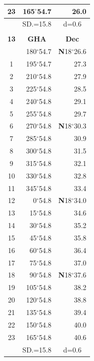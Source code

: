 \documentclass[10pt, a4paper]{report}
\begin{document}
\begin{scriptsize}
\begin{tabular*}{0.2\textwidth}[t]{@{\extracolsep{\fill}}|c|rr|}
23 & 165$^\circ$54.7 & 26.0\\
\hline
\rule{0pt}{2.4ex} & \multicolumn{1}{c}{SD.=15.8} & \multicolumn{1}{c|}{d=0.6}\\
\hline
\multicolumn{1}{c}{}\\[-0.5ex]\hline
\multicolumn{1}{|c|}{\rule{0pt}{2.6ex}\textbf{13}} & \multicolumn{1}{c}{\textbf{GHA}} & \multicolumn{1}{c|}{\textbf{Dec}}\\
\hline\rule{0pt}{2.6ex}\noindent
0 & 180$^\circ$54.7 & \textbf{N}18$^\circ$26.6\\
1 & 195$^\circ$54.7 & 27.3\\
2 & 210$^\circ$54.8 & 27.9\\
3 & 225$^\circ$54.8 & \raisebox{0.24ex}{\boldmath$\cdot$~\boldmath$\cdot$~~}28.5\\
4 & 240$^\circ$54.8 & 29.1\\
5 & 255$^\circ$54.8 & 29.7\\[2Pt]
6 & 270$^\circ$54.8 & \textbf{N}18$^\circ$30.3\\
7 & 285$^\circ$54.8 & 30.9\\
8 & 300$^\circ$54.8 & 31.5\\
9 & 315$^\circ$54.8 & \raisebox{0.24ex}{\boldmath$\cdot$~\boldmath$\cdot$~~}32.1\\
10 & 330$^\circ$54.8 & 32.8\\
11 & 345$^\circ$54.8 & 33.4\\[2Pt]
12 & 0$^\circ$54.8 & \textbf{N}18$^\circ$34.0\\
13 & 15$^\circ$54.8 & 34.6\\
14 & 30$^\circ$54.8 & 35.2\\
15 & 45$^\circ$54.8 & \raisebox{0.24ex}{\boldmath$\cdot$~\boldmath$\cdot$~~}35.8\\
16 & 60$^\circ$54.8 & 36.4\\
17 & 75$^\circ$54.8 & 37.0\\[2Pt]
18 & 90$^\circ$54.8 & \textbf{N}18$^\circ$37.6\\
19 & 105$^\circ$54.8 & 38.2\\
20 & 120$^\circ$54.8 & 38.8\\
21 & 135$^\circ$54.8 & \raisebox{0.24ex}{\boldmath$\cdot$~\boldmath$\cdot$~~}39.4\\
22 & 150$^\circ$54.8 & 40.0\\
23 & 165$^\circ$54.8 & 40.6\\
\hline
\rule{0pt}{2.4ex} & \multicolumn{1}{c}{SD.=15.8} & \multicolumn{1}{c|}{d=0.6}\\
\hline
\end{tabular*}\noindent

\end{scriptsize}
\end{document}
